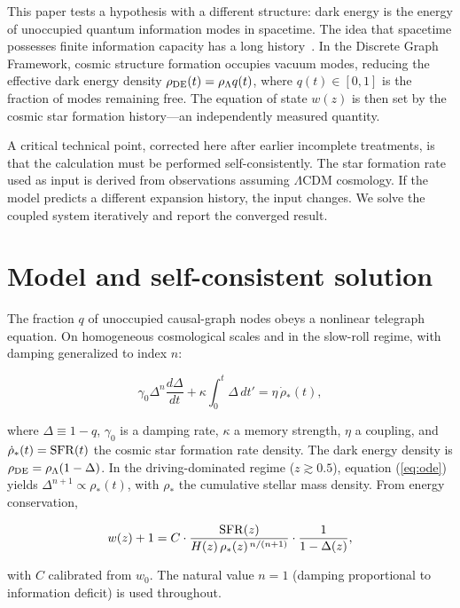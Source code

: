 \documentclass[12pt,a4paper]{article}
\begin{document}
This paper tests a hypothesis with a different structure: dark energy is the energy of unoccupied quantum information modes in spacetime. The idea that spacetime possesses finite information capacity has a long history~\cite{thooft1993,susskind1995,sorkin2005,verlinde2011,jacobson1995}. In the Discrete Graph Framework, cosmic structure formation occupies vacuum modes, reducing the effective dark energy density $\rho_{\rm DE}(t)=\rho_\Lambda q(t)$, where $q(t)\in[0,1]$ is the fraction of modes remaining free. The equation of state $w(z)$ is then set by the cosmic star formation history---an independently measured quantity.

A critical technical point, corrected here after earlier incomplete treatments, is that the calculation must be performed self-consistently. The star formation rate used as input is derived from observations assuming $\Lambda$CDM cosmology. If the model predicts a different expansion history, the input changes. We solve the coupled system iteratively and report the converged result.

\section*{Model and self-consistent solution}

The fraction $q$ of unoccupied causal-graph nodes obeys a nonlinear telegraph equation. On homogeneous cosmological scales and in the slow-roll regime, with damping generalized to index $n$:

\begin{equation}\label{eq:ode}
\gamma_0\Delta^n\frac{d\Delta}{dt} + \kappa\int_0^t\Delta\,dt' = \eta\,\dot{\rho}_*(t),
\end{equation}

where $\Delta\equiv1-q$, $\gamma_0$ is a damping rate, $\kappa$ a memory strength, $\eta$ a coupling, and $\dot{\rho}_*(t)={\rm SFR}(t)$ the cosmic star formation rate density. The dark energy density is $\rho_{\rm DE}=\rho_\Lambda(1-\Delta)$. In the driving-dominated regime ($z\gtrsim0.5$), equation (\ref{eq:ode}) yields $\Delta^{n+1}\propto\rho_*(t)$, with $\rho_*$ the cumulative stellar mass density. From energy conservation,

\begin{equation}\label{eq:shape}
w(z)+1 = C\cdot\frac{{\rm SFR}(z)}{H(z)\,\rho_*(z)^{\,n/(n+1)}}\cdot\frac{1}{1-\Delta(z)},
\end{equation}

with $C$ calibrated from $w_0$. The natural value $n=1$ (damping proportional to information deficit) is used throughout.
\end{document}
